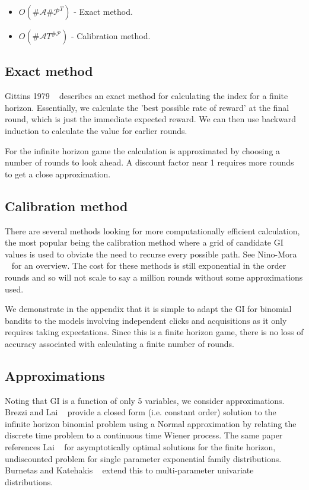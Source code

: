 \documentclass[11pt,a4,singlespacing,titlepagenumber=on]{scrreprt}
\numberwithin{equation}{chapter} %
\theoremstyle{remark}
\begin{document}
\begin{itemize}
	\item $O(\#\mathcal{A} {\#\mathcal{P}}^T)$ - Exact method.
	\item $O(\#\mathcal{A} T^{\#\mathcal{P}})$ - Calibration method.
\end{itemize}

\subsection{ Exact method }

Gittins 1979 ~\cite{gittins1979bandit} describes an exact method for calculating the index for a finite horizon. Essentially, we calculate the 'best possible rate of reward' at the final round, which is just the immediate expected reward. We can then use backward induction to calculate the value for earlier rounds.

For the infinite horizon game the calculation is approximated by choosing a number of rounds to look ahead. A discount factor near 1 requires more rounds to get a close approximation.

\subsection{ Calibration method }

There are several methods looking for more computationally efficient calculation, the most popular being the calibration method where a grid of candidate GI values is used to obviate the need to recurse every possible path. See Nino-Mora ~\cite{nino2011computing} for an overview. The cost for these methods is still exponential in the order rounds and so will not scale to say a million rounds without some approximations used.

We demonstrate in the appendix that it is simple to adapt the GI for binomial bandits to the models involving independent clicks and acquisitions as it only requires taking expectations. Since this is a finite horizon game, there is no loss of accuracy associated with calculating a finite number of rounds.

\subsection{ Approximations }

Noting that GI is a function of only 5 variables, we consider approximations. Brezzi and Lai ~\cite{brezzi2002optimal} provide a closed form (i.e. constant order) solution to the infinite horizon binomial problem using a Normal approximation by relating the discrete time problem to a continuous time Wiener process.  The same paper references Lai ~\cite{lai1987adaptive} for asymptotically optimal solutions for the finite horizon, undiscounted problem for single parameter exponential family distributions. Burnetas and Katehakis ~\cite{burnetas1996optimal} extend this to multi-parameter univariate distributions.
\end{document}
